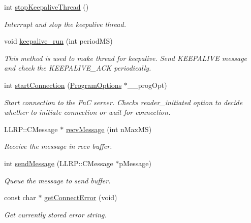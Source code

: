 \begin{DoxyCompactItemize}
int \hyperlink{class_e_l_f_i_n_1_1_c_connection_fn_c_mgr_aa23c373881a560ef974cd1152ea76c43}{stop\-Keepalive\-Thread} ()
\begin{DoxyCompactList}\small\item\em Interrupt and stop the keepalive thread. \end{DoxyCompactList}\item 
void \hyperlink{class_e_l_f_i_n_1_1_c_connection_fn_c_mgr_a0f4f281ce4e577eb32c8df5052106fa3}{keepalive\-\_\-run} (int period\-M\-S)
\begin{DoxyCompactList}\small\item\em This method is used to make thread for keepalive. Send K\-E\-E\-P\-A\-L\-I\-V\-E message and check the K\-E\-E\-P\-A\-L\-I\-V\-E\-\_\-\-A\-C\-K periodically. \end{DoxyCompactList}\item 
int \hyperlink{class_e_l_f_i_n_1_1_c_connection_fn_c_mgr_afeb7e321253ac8ab298958393ecfabc5}{start\-Connection} (\hyperlink{class_e_l_f_i_n_1_1_program_options}{Program\-Options} $\ast$\-\_\-\-\_\-prog\-Opt)
\begin{DoxyCompactList}\small\item\em Start connection to the Fn\-C server. Checks reader\-\_\-initiated option to decide whether to initiate connection or wait for connection. \end{DoxyCompactList}\item 
L\-L\-R\-P\-::\-C\-Message $\ast$ \hyperlink{class_e_l_f_i_n_1_1_c_connection_fn_c_mgr_a615454a57231aca62fc6f0fa73df64dd}{recv\-Message} (int n\-Max\-M\-S)
\begin{DoxyCompactList}\small\item\em Receive the message in recv buffer. \end{DoxyCompactList}\item 
int \hyperlink{class_e_l_f_i_n_1_1_c_connection_fn_c_mgr_a48b283f30ddd8c2b0c2ed55e844085f8}{send\-Message} (L\-L\-R\-P\-::\-C\-Message $\ast$p\-Message)
\begin{DoxyCompactList}\small\item\em Queue the message to send buffer. \end{DoxyCompactList}\item 
const char $\ast$ \hyperlink{class_e_l_f_i_n_1_1_c_connection_fn_c_mgr_aea8e109f15d3f1fb041407e84fdfa934}{get\-Connect\-Error} (void)
\begin{DoxyCompactList}\small\item\em Get currently stored error string. \end{DoxyCompactList}\item 

\end{DoxyCompactItemize}
